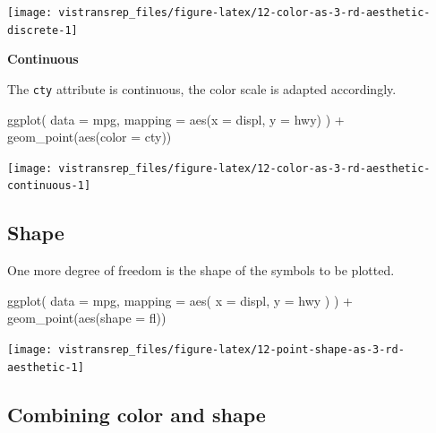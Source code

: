 \documentclass[]{book}
\newenvironment{Shaded}{}{}
\newcommand{\DataTypeTok}[1]{#1}
\newcommand{\KeywordTok}[1]{\textcolor[rgb]{0.00,0.00,1.00}{#1}}
\newcommand{\NormalTok}[1]{#1}
\newcommand{\OperatorTok}[1]{#1}
\newcommand{\StringTok}[1]{\textcolor[rgb]{0.00,0.50,0.50}{#1}}
\begin{document}
\begin{flushright}\texttt{[image: vistransrep\_files/figure-latex/12-color-as-3-rd-aesthetic-discrete-1]} \end{flushright}

\textbf{Continuous}

The \texttt{cty} attribute is continuous, the color scale is adapted accordingly.

\begin{Shaded}
\begin{Highlighting}[]
\KeywordTok{ggplot}\NormalTok{(}
  \DataTypeTok{data =}\NormalTok{ mpg,}
  \DataTypeTok{mapping =} \KeywordTok{aes}\NormalTok{(}\DataTypeTok{x =}\NormalTok{ displ, }\DataTypeTok{y =}\NormalTok{ hwy)}
\NormalTok{) }\OperatorTok{+}
\StringTok{  }\KeywordTok{geom_point}\NormalTok{(}\KeywordTok{aes}\NormalTok{(}\DataTypeTok{color =}\NormalTok{ cty))}
\end{Highlighting}
\end{Shaded}

\begin{flushright}\texttt{[image: vistransrep\_files/figure-latex/12-color-as-3-rd-aesthetic-continuous-1]} \end{flushright}

\hypertarget{shape}{%
\subsection{Shape}\label{shape}}

One more degree of freedom is the shape of the symbols to be plotted.

\begin{Shaded}
\begin{Highlighting}[]
\KeywordTok{ggplot}\NormalTok{(}
  \DataTypeTok{data =}\NormalTok{ mpg,}
  \DataTypeTok{mapping =} \KeywordTok{aes}\NormalTok{(}
    \DataTypeTok{x =}\NormalTok{ displ,}
    \DataTypeTok{y =}\NormalTok{ hwy}
\NormalTok{  )}
\NormalTok{) }\OperatorTok{+}
\StringTok{  }\KeywordTok{geom_point}\NormalTok{(}\KeywordTok{aes}\NormalTok{(}\DataTypeTok{shape =}\NormalTok{ fl))}
\end{Highlighting}
\end{Shaded}

\begin{flushright}\texttt{[image: vistransrep\_files/figure-latex/12-point-shape-as-3-rd-aesthetic-1]} \end{flushright}

\hypertarget{combining-color-and-shape}{%
\subsection{Combining color and shape}\label{combining-color-and-shape}}
\end{document}
